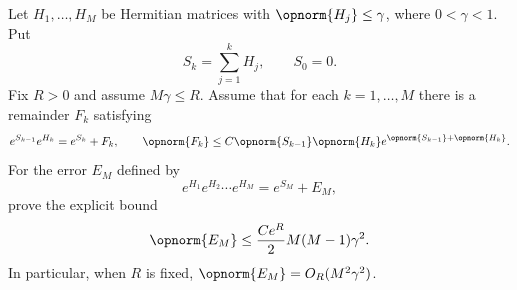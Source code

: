 Let $H_1,\dots,H_M$ be Hermitian matrices with $\opnorm{H_j}\leq\gamma$, where $0<\gamma<1$.  Put
$$
    S_k=\sum_{j=1}^k H_j,
    \qquad S_0=0.
$$
Fix $R>0$ and assume $M\gamma\leq R$.  Assume that for each $k=1,\dots,M$ there is a remainder $F_k$ satisfying
$$
    e^{S_{k-1}}e^{H_k}=e^{S_k}+F_k,
    \qquad
    \opnorm{F_k}\leq C\opnorm{S_{k-1}}\opnorm{H_k}
        e^{\opnorm{S_{k-1}}+\opnorm{H_k}} .
$$
For the error $E_M$ defined by
$$
    e^{H_1}e^{H_2}\cdots e^{H_M}=e^{S_M}+E_M,
$$
prove the explicit bound
$$
    \opnorm{E_M}
    \leq
    \frac{C e^R}{2}M(M-1)\gamma^2 .
$$
In particular, when $R$ is fixed, $\opnorm{E_M}=O_R(M^2\gamma^2)$.
